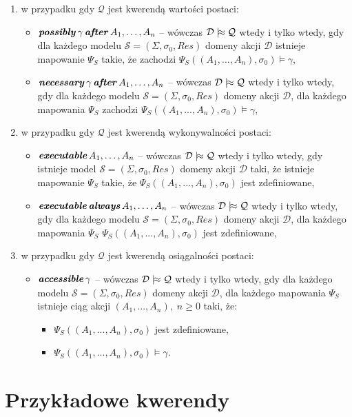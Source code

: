\documentclass[11pt,a4paper]{article}
\DeclareMathOperator{\After}{\textbf{\textit{after}}}
\DeclareMathOperator{\Always}{\textbf{\textit{always}}}
\DeclareMathOperator{\Executable}{\textbf{\textit{executable}}}
\DeclareMathOperator{\Accessible}{\textbf{\textit{accessible}}}
\DeclareMathOperator{\Possibly}{\textbf{\textit{possibly}}}
\DeclareMathOperator{\Necessary}{\textbf{\textit{necessary}}}
\def\consequence{\mathrel|\joinrel\approx}
\begin{document}
    \begin{enumerate}
        \item w przypadku gdy $\mathcal{Q}$ jest kwerendą wartości postaci:
        \begin{itemize}
            \item $\Possibly \gamma \After A_1, \dots, A_n$ -- wówczas $\mathcal{D} \consequence \mathcal{Q}$ wtedy i tylko wtedy, gdy dla każdego modelu %
            $\mathcal{S} = (\Sigma,\sigma_0,Res)$ domeny akcji $\mathcal{D}$ istnieje mapowanie $\Psi_S$ takie, że zachodzi $\Psi_S((A_1,...,A_n),\sigma_{0}) \models \gamma$,
            \item $\Necessary \gamma \After A_1, \dots, A_n$ -- wówczas $\mathcal{D} \consequence \mathcal{Q}$ wtedy i tylko wtedy, gdy dla każdego modelu %
            $\mathcal{S} = (\Sigma,\sigma_0,Res)$ domeny akcji $\mathcal{D}$, dla każdego mapowania $\Psi_S$ zachodzi $\Psi_S((A_1,...,A_n),\sigma_{0}) \models \gamma$,
        \end{itemize}
        \item w przypadku gdy $\mathcal{Q}$ jest kwerendą wykonywalności postaci:
        \begin{itemize}
            \item $\Executable A_1, \dots, A_n$ -- wówczas $\mathcal{D} \consequence \mathcal{Q}$ wtedy i tylko wtedy, gdy istnieje model %
            $\mathcal{S} = (\Sigma,\sigma_0,Res)$ domeny akcji $\mathcal{D}$ taki, że istnieje %
            mapowanie $\Psi_S$ takie, że $\Psi_S((A_1,...,A_n),\sigma_{0})$ jest zdefiniowane,
            \item $\Executable \Always A_1, \dots, A_n$ -- wówczas $\mathcal{D} \consequence \mathcal{Q}$ wtedy i tylko wtedy, gdy dla każdego modelu %
            $\mathcal{S} = (\Sigma,\sigma_0,Res)$ domeny akcji $\mathcal{D}$, dla każdego mapowania $\Psi_S$ $\Psi_S((A_1,...,A_n),\sigma_{0})$ jest zdefiniowane,
        \end{itemize}
        \item w przypadku gdy $\mathcal{Q}$ jest kwerendą osiągalności postaci:
        \begin{itemize}
            \item $\Accessible \gamma$ -- wówczas $\mathcal{D} \consequence \mathcal{Q}$ wtedy i tylko wtedy, gdy dla każdego modelu $\mathcal{S} = (\Sigma,\sigma_0,Res)$ domeny akcji $\mathcal{D}$, dla każdego mapowania $\Psi_S$ istnieje ciąg akcji $(A_1,...,A_n), \; n \geq 0$ taki, że:
            \begin{itemize}
                \item $\Psi_S((A_1,...,A_n),\sigma_{0})$ jest zdefiniowane,
                \item $\Psi_S((A_1,...,A_n),\sigma_{0}) \models \gamma$.
            \end{itemize}
        \end{itemize}
    \end{enumerate}


\section{Przykładowe kwerendy}

\end{document}
